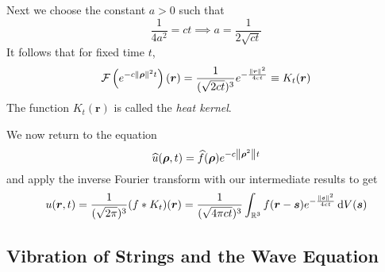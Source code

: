 \documentclass[11pt, a4paper]{article}
\newcommand{\diff}{\mathop{}\!\mathrm{d}} %
\newcommand{\R}{\mathbb{R}} %
\begin{document}
Next we choose the constant $ a > 0 $ such that
\begin{equation*}
	\frac{1}{4a^2} = ct \implies a = \frac{1}{2\sqrt{ct}}
\end{equation*}
It follows that for fixed time $ t $,
\begin{equation*}
	\mathcal{F}\left(e^{-c\norm{\bm{\rho}}^2t} \right)(\bm{r}) = \frac{1}{(\sqrt{2ct})^3} e^{-\frac{\norm{\bm{r}}^2}{4ct}} \equiv K_{t}(\bm{r}) 
\end{equation*}
The function $ K_{t}(\bm{r}) $ is called the \textit{heat kernel}. 

We now return to the equation
\begin{equation*}
	\widehat{u}(\bm{\rho}, t) = \widehat{f}(\bm{\rho})   e^{-c\norm{\bm{\rho}^2}t }
\end{equation*}
and apply the inverse Fourier transform with our intermediate results to get
\begin{equation*}
	u(\bm{r}, t) = \frac{1}{(\sqrt{2\pi})^3} (f*K_{t})(\bm{r}) = \frac{1}{(\sqrt{4\pi ct})^3} \int_{\R^3}f(\bm{r} - \bm{s})e^{-\frac{\norm{\bm{s}}^2}{4ct}}\diff V (\bm{s})
\end{equation*}

\subsection{Vibration of Strings and the Wave Equation}
\end{document}
